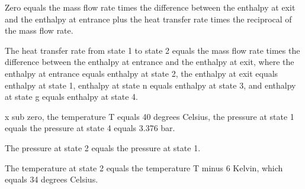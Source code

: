 Zero equals the mass flow rate times the difference between the enthalpy at exit and the enthalpy at entrance plus the heat transfer rate times the reciprocal of the mass flow rate.

The heat transfer rate from state 1 to state 2 equals the mass flow rate times the difference between the enthalpy at entrance and the enthalpy at exit, where the enthalpy at entrance equals enthalpy at state 2, the enthalpy at exit equals enthalpy at state 1, enthalpy at state n equals enthalpy at state 3, and enthalpy at state g equals enthalpy at state 4.

x sub zero, the temperature T equals 40 degrees Celsius, the pressure at state 1 equals the pressure at state 4 equals 3.376 bar.

The pressure at state 2 equals the pressure at state 1.

The temperature at state 2 equals the temperature T minus 6 Kelvin, which equals 34 degrees Celsius.